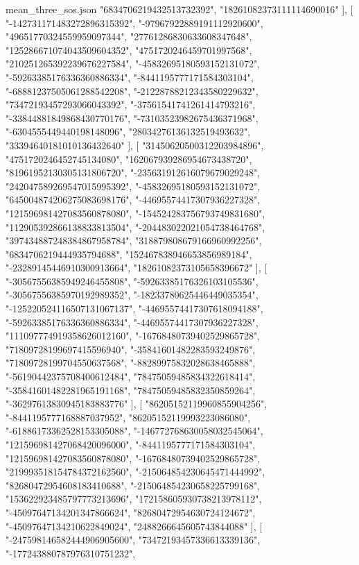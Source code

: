 \begin{filecontents*}[overwrite]{mean_three_sos.json}
    "6834706219432513732392",
    "18261082373111114690016"
   ],
   [
    "-142731171483272896315392",
    "-97967922889191112920600",
    "49651770324559959097344",
    "27761286830633608347648",
    "125286671074043509604352",
    "4751720246459701997568",
    "210251265392239676227584",
    "-45832695180593152131072",
    "-59263385176336360886334",
    "-8441195777171584303104",
    "-68881237505061288542208",
    "-21228788212343580229632",
    "73472193457293066043392",
    "-37561541741261414793216",
    "-33844881849868430770176",
    "-73103523982675436371968",
    "-6304555449440198148096",
    "28034276136132519493632",
    "33394640181010136432640"
   ],
   [
    "31450620500312203984896",
    "4751720246452745134080",
    "162067939286954673438720",
    "81961952130305131806720",
    "-235631912616079679029248",
    "242047589269547015995392",
    "-45832695180593152131072",
    "645004874206275083698176",
    "-44695574417307936227328",
    "121596981427083560878080",
    "-154524283756793749831680",
    "112905392866138833813504",
    "-204483022021054738464768",
    "397434887248384867958784",
    "318879808679166960992256",
    "6834706219444935794688",
    "152467838946653856989184",
    "-23289145446910300913664",
    "18261082373105658396672"
   ],
   [
    "-30567556385949246455808",
    "-59263385176326103105536",
    "-30567556385970192989352",
    "-18233780625446449035354",
    "-125220524116507131067137",
    "-44695574417307618094188",
    "-59263385176336360886334",
    "-44695574417307936227328",
    "111097774919358626012160",
    "-16768480739402529865728",
    "71809728199697415596940",
    "-35841601482283593249876",
    "71809728199704550637568",
    "-88289975832028638465888",
    "-56190442375708400612484",
    "78475059485834322618414",
    "-35841601482281965191168",
    "78475059485832350859264",
    "-36297613830945183883776"
   ],
   [
    "86205152119960855904256",
    "-8441195777168887037952",
    "86205152119993223086080",
    "-61886173362528153305088",
    "-146772768630058032545064",
    "121596981427068420096000",
    "-8441195777171584303104",
    "121596981427083560878080",
    "-16768480739402529865728",
    "219993518154784372162560",
    "-215064854230645471444992",
    "82680472954608183410688",
    "-215064854230658225799168",
    "153622923485797773213696",
    "172158605930738213978112",
    "-45097647134201347866624",
    "82680472954630724124672",
    "-45097647134210622849024",
    "2488266645605743844088"
   ],
   [
    "-247598146582444906905600",
    "73472193457336613339136",
    "-177243880787976310751232",

\end{filecontents*}
